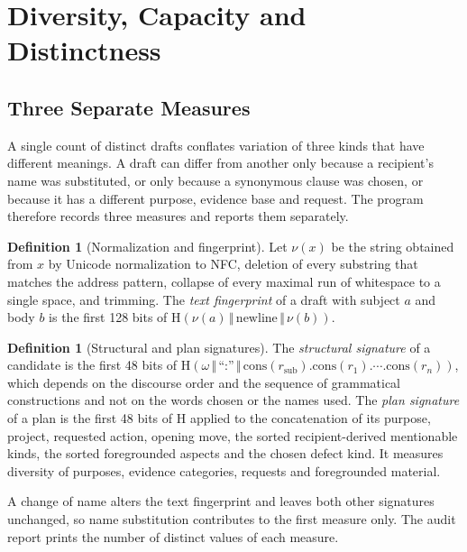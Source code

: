 \documentclass[11pt]{article}
\theoremstyle{definition}
\newtheorem{definition}[theorem]{Definition}
\theoremstyle{remark}
\newcommand{\Hash}{\mathrm{H}}
\begin{document}
\section{Diversity, Capacity and Distinctness}\label{sec:div}

\subsection{Three Separate Measures}

A single count of distinct drafts conflates variation of three kinds that have different meanings. A draft can differ from another only because a recipient's name was substituted, or only because a synonymous clause was chosen, or because it has a different purpose, evidence base and request. The program therefore records three measures and reports them separately.

\begin{definition}[Normalization and fingerprint]\label{def:fp}
Let $\nu(x)$ be the string obtained from $x$ by Unicode normalization to NFC, deletion of every substring that matches the address pattern, collapse of every maximal run of whitespace to a single space, and trimming. The \emph{text fingerprint} of a draft with subject $a$ and body $b$ is the first 128 bits of $\Hash(\nu(a)\,\Vert\,\mathrm{newline}\,\Vert\,\nu(b))$.
\end{definition}

\begin{definition}[Structural and plan signatures]\label{def:sig}
The \emph{structural signature} of a candidate is the first 48 bits of $\Hash(\omega\,\Vert\,\text{``:''}\,\Vert\,\mathrm{cons}(r_{\mathrm{sub}}).\mathrm{cons}(r_1).\cdots.\mathrm{cons}(r_n))$, which depends on the discourse order and the sequence of grammatical constructions and not on the words chosen or the names used. The \emph{plan signature} of a plan is the first 48 bits of $\Hash$ applied to the concatenation of its purpose, project, requested action, opening move, the sorted recipient-derived mentionable kinds, the sorted foregrounded aspects and the chosen defect kind. It measures diversity of purposes, evidence categories, requests and foregrounded material.
\end{definition}

A change of name alters the text fingerprint and leaves both other signatures unchanged, so name substitution contributes to the first measure only. The audit report prints the number of distinct values of each measure.
\end{document}
